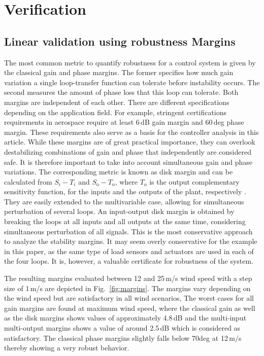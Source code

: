 \documentclass[times]{weauth}
\begin{document}
 
\section{Verification}
\subsection{Linear validation using robustness Margins}
The most common metric to quantify robustness for a control system is given by
the classical gain and phase margins. The former specifies how much gain
variation a single loop-transfer function can tolerate before instability
occurs. The second measures the amount of phase loss that this loop can
tolerate. Both margins are independent of each other. There are different
specifications depending on the application field. For example, stringent
certifications requirements in aerospace require at least 6\,dB gain margin and
60\,deg phase margin. These requirements also serve as a basis for the
controller analysis in this article. While these margins are of great
practical importance, they can overlook destabilizing combinations of gain and
phase that independently are considered safe. It is therefore important to
take into account simultaneous gain and phase variations. The corresponding
metric is known as disk margin and can be calculated from $S_i-T_i$ and $S_{\text{o}}
- T_{\text{o}}$, where $T_{\text{o}}$ is the output complementary sensitivity function,
for the inputs and the outputs of the plant, respectively \cite{blight94}. They
are easily extended to the multivariable case, allowing for simultaneous
perturbation of several loops. An input-output disk margin is obtained by
breaking the loops at all inputs and all outputs at the same time, considering
simultaneous perturbation of all signals. This is the most conservative
approach to analyze the stability margins. It may seem overly conservative for the
example in this paper, as the same type of load sensors and actuators
are used in each of the four loops. It is, however, a valuable certificate
for robustness of the system.

The resulting margins evaluated between 12 and 25\,m/s wind speed with a step size of 1\,m/s
are depicted in Fig.~\ref{fig:margins}. 
The margins vary depending on the wind speed but are satisfactory in all wind scenarios,
The worst cases for all gain margins are found at maximum wind speed, where the classical gain as well
as the disk margins shows values of approximately 4.8\,dB and the multi-input multi-output margins
shows a value of around 2.5\,dB which is considered as satisfactory. The classical phase margins
slightly falls below 70deg at 12\,m/s thereby showing a very robust behavior.
\end{document}

